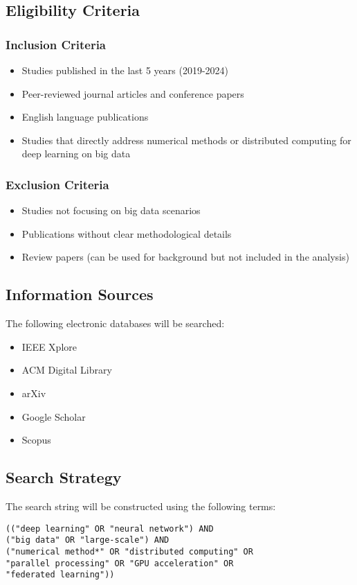 \documentclass[a4paper,12pt]{article}
\begin{document}
\subsection{Eligibility Criteria}
\subsubsection{Inclusion Criteria}
\begin{itemize}
    \item Studies published in the last 5 years (2019-2024)
    \item Peer-reviewed journal articles and conference papers
    \item English language publications
    \item Studies that directly address numerical methods or distributed computing for deep learning on big data
\end{itemize}

\subsubsection{Exclusion Criteria}
\begin{itemize}
    \item Studies not focusing on big data scenarios
    \item Publications without clear methodological details
    \item Review papers (can be used for background but not included in the analysis)
\end{itemize}

\subsection{Information Sources}
The following electronic databases will be searched:
\begin{itemize}
    \item IEEE Xplore
    \item ACM Digital Library
    \item arXiv
    \item Google Scholar
    \item Scopus
\end{itemize}

\subsection{Search Strategy}
The search string will be constructed using the following terms:
\begin{verbatim}
(("deep learning" OR "neural network") AND 
("big data" OR "large-scale") AND 
("numerical method*" OR "distributed computing" OR 
"parallel processing" OR "GPU acceleration" OR 
"federated learning"))
\end{verbatim}
\end{document}
